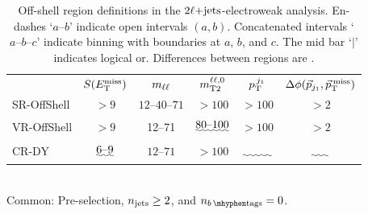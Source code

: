 \begin{table}[tp]
\centering
\begin{tabular}{lccccc}
& $S(E_\mathrm{T}^\mathrm{miss})$
& $m_{\ell\ell}$
& $m_\mathrm{T2}^{\ell\ell,0}$
& $p_\mathrm{T}^{\,j_1}$
& $\Delta\phi(\vec p_{j_1}, \vec p_\mathrm{T}^\mathrm{\:miss})$
\\[1em]
SR-OffShell
& $>9$
& $12\textrm{--}40\textrm{--}71$
& $>100$
& $>100$
& $>2$
\\[0.5em]
\: VR-OffShell
& $>9$
&  12--71
& $\uwave{80\textrm{--}100}$
& $> 100$
& $> 2$
\\[1em]
CR-DY
& $\uwave{6\textrm{--}9}$
& $12\textrm{--}71$
& $> 100$
& $\uwave{\hphantom{> 100}}$
& $\uwave{\hphantom{> 2}}$
\end{tabular}
\\[1em]
Common: Pre-selection,
$n_\mathrm{jets} \geq 2$, and
$\nbtag = 0$.
\caption[
Off-shell region definitions in the $\twoljets$-electroweak analysis
]{%
Off-shell region definitions in the $\twoljets$-electroweak analysis.
En-dashes `$a\textrm{--}b$' indicate open intervals $(a, b)$.
Concatenated intervals `$a\textrm{--}b\textrm{--}c$' indicate binning
with boundaries at $a$, $b$, and $c$.
The mid bar `$\mid$' indicates logical or.
Differences between regions are .
}
\label{tab:2ljets_offshell}
\end{table}

